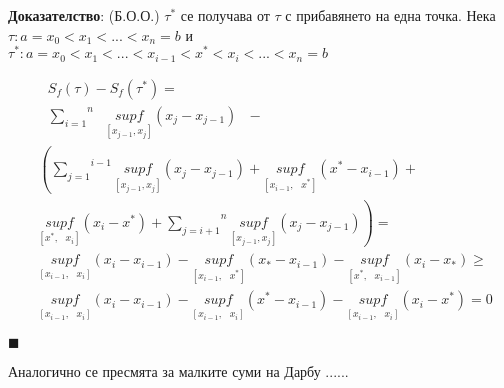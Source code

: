 \documentclass[12pt]{article}
\newcommand{\suma}[2]{\overset{#2}{\underset{#1}{\sum}}}
\newcommand{\spc}{\text{ }}
\begin{document}
	\textbf{Доказателство}: (Б.О.О.) $\tau^{*}$ се получава от $\tau$ с прибавянето на една точка.
	Нека $\tau : a=x_{0}<x_{1}<...<x_{n}=b$ и
	$\tau^{*} : a=x_{0}<x_{1}<...<x_{i-1}<x^{*}<x_{i}<...<x_{n}=b$ 
	\newline
	
	\begin{equation*}
		\begin{aligned}
			&\spc S_{f}\left(\tau\right) - S_{f}\left(\tau^{*}\right) =
			\\
			&\spc\suma{i=1}{n}\spc\underset{\left[x_{j-1}, x_{j}\right]}{sup f} \left(x_{j} - x_{j-1}\right)\spc-
			\\
			&\left(
			\suma{j=1}{i-1}\underset{\left[x_{j-1}, x_{j}\right]}{sup f} \left(x_{j} - x_{j-1}\right) + 
			\underset{\left[x_{i-1},\spc x^{*}\right]}{sup f} \left(x^{*} - x_{i-1}\right) +
			\right. \\ &\left.
			\underset{\left[x^{*},\spc x_{i}\right]}{sup f} \left(x_{i} - x^{*}\right) +
			\suma{j=i+1}{n}\underset{\left[x_{j-1}, x_{j}\right]}{sup f} \left(x_{j} - x_{j-1}\right)
			\right) =
			\\
			&\underset{\left[x_{i-1},\spc x_{i}\right]}{sup f} \left(x_{i} - x_{i-1}\right) - 
			\underset{\left[x_{i-1},\spc x^{*}\right]}{sup f} \left(x_{*} - x_{i-1}\right) -
			\underset{\left[x^{*},\spc x_{i-1}\right]}{sup f} \left(x_{i} - x_{*}\right) \geq
			\\
			&\underset{\left[x_{i-1},\spc x_{i}\right]}{sup f} \left(x_{i} - x_{i-1}\right) - 
			\underset{\left[x_{i-1},\spc x_{i}\right]}{sup f} \left(x^{*} - x_{i-1}\right) -
			\underset{\left[x_{i-1},\spc x_{i}\right]}{sup f} \left(x_{i} - x^{*}\right) = 0 
		\end{aligned}
	\end{equation*}
	\begin{flushright}
		$\blacksquare$
	\end{flushright}
	Аналогично се пресмята за малките суми на Дарбу ......
	
\end{document}
